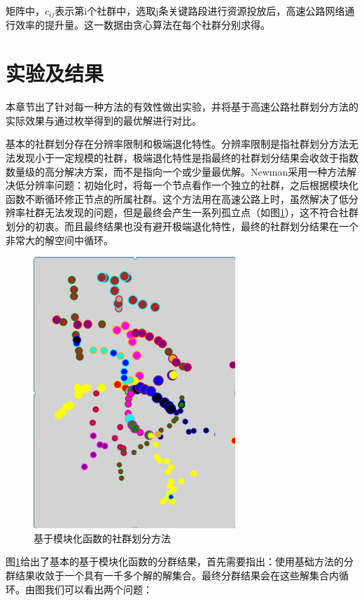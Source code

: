 				矩阵中，$c_{ij}$表示第i个社群中，选取j条关键路段进行资源投放后，高速公路网络通行效率的提升量。这一数据由贪心算法在每个社群分别求得。

	\section{实验及结果}
		本章节出了针对每一种方法的有效性做出实验，并将基于高速公路社群划分方法的实际效果与通过枚举得到的最优解进行对比。

		基本的社群划分存在分辨率限制和极端退化特性。分辨率限制是指社群划分方法无法发现小于一定规模的社群，极端退化特性是指最终的社群划分结果会收敛于指数数量级的高分解决方案，而不是指向一个或少量最优解。Newman\parencite{NewmanFast}采用一种方法解决低分辨率问题：初始化时，将每一个节点看作一个独立的社群，之后根据模块化函数不断循环修正节点的所属社群。这个方法用在高速公路上时，虽然解决了低分辨率社群无法发现的问题，但是最终会产生一系列孤立点（如图\ref{gulidian}），这不符合社群划分的初衷。而且最终结果也没有避开极端退化特性，最终的社群划分结果在一个非常大的解空间中循环。

			\begin{figure}[h]
			\centering
					\begin{minipage}{0.8\linewidth}
						\centering
						\includegraphics[width=3in]{picture/liuliangbianquan}
						\caption{基于模块化函数的社群划分方法}
						\label{gulidian}
					\end{minipage}
			\end{figure}

		图\ref{gulidian}给出了基本的基于模块化函数的分群结果，首先需要指出：使用基础方法的分群结果收敛于一个具有一千多个解的解集合。最终分群结果会在这些解集合内循环。由图我们可以看出两个问题：

